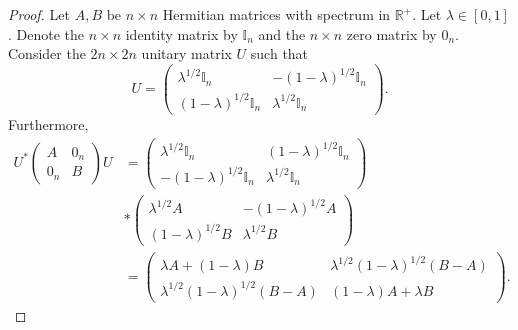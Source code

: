 \documentclass[12pt,a4paper]{amsart}
\theoremstyle{definition}
\begin{document}
	\begin{proof}
		Let $A, B$ be $n \times n$ Hermitian matrices with spectrum in $\mathbb{R}^{+}$. Let $\lambda \in [0,1]$. Denote the $n \times n$ identity matrix by $\mathbb{I}_n$ and the $n \times n$ zero matrix by $0_n$. Consider the $2n \times 2n$ unitary matrix $U$ such that
		\[  U  =  		
		\begin{pmatrix}
			\lambda^{1/2} \mathbb{I}_n &   -(1-\lambda)^{1/2}\mathbb{I}_n \\
			(1-\lambda)^{1/2} \mathbb{I}_n & \lambda^{1/2} \mathbb{I}_n
		\end{pmatrix}. \]
		Furthermore,  
		\begin{align*}
			U^{*} 	\begin{pmatrix}
				A &   0_n \\
				0_n & B
			\end{pmatrix}  U 
			&= 
			\begin{pmatrix}
				\lambda^{1/2} \mathbb{I}_n & (1-\lambda)^{1/2} \mathbb{I}_n  \\
				-(1-\lambda)^{1/2}\mathbb{I}_n   & \lambda^{1/2} \mathbb{I}_n
			\end{pmatrix} \\
			&*
			\begin{pmatrix}
				\lambda^{1/2} A &   -(1-\lambda)^{1/2} A  \\
				(1-\lambda)^{1/2} B & \lambda^{1/2} B
			\end{pmatrix} \\
			&=
			\begin{pmatrix}
				\lambda A + (1-\lambda)B &   \lambda^{1/2}(1-\lambda)^{1/2}(B-A) \\
				\lambda^{1/2}(1-\lambda)^{1/2}(B-A) & (1-\lambda)A + \lambda B
			\end{pmatrix}. 
		\end{align*}
		

\end{proof}
\end{document}
